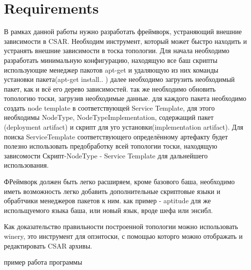 
\chapter{Requirements}
\label{chap:req}


В рамках данной работы нужно разработать фреймворк, устраняющий внешние зависимости в CSAR. 
Необходим инструмент, который может быстро находить и устранять внешние зависимости в тоска топологии. 
Для начала необходимо разработать минимальную конфигурацию, находящую все баш скрипты использующие менеджер пакотов apt-get и удаляющую из них команды установки пакета(apt-get install.. )
далее необходимо загрузить необходимый пакет, как и всё его дерево зависимостей. так же необходимо обновить топологию тоски, загрузив необходимые данные. 
для каждого пакета необходимо создать node template в соответствующей Service Template, для этого необходимы NodeType, NodeTypeImplementation, содержащий пакет (deployment artifact) и скрипт для уго установки(implementation artifact). 
Для поиска ServiceTemplate соответствующего определённому артефакту будет полезно использовать предобработку всей топологии тоски, находящую зависомости Скрипт-NodeType - Service Template для дальнейшего использования.

ФРеймворк должен быть легко расширяем, кроме базового баша, необходимо иметь возможность легко добавить дополнительные скриптовые языки и обрабтчики менеджеров пакетов к ним. как пример - aptitude для же испольщуемого языка баша, или новый язык, вроде шефа или энсибл.

Как доказательство правильности построенной топологии можно использовать winery, 
это инструмент для опэнтоски, с помощью которго можно отображать и редактировать CSAR архивы.

пример работа программы
\fi
